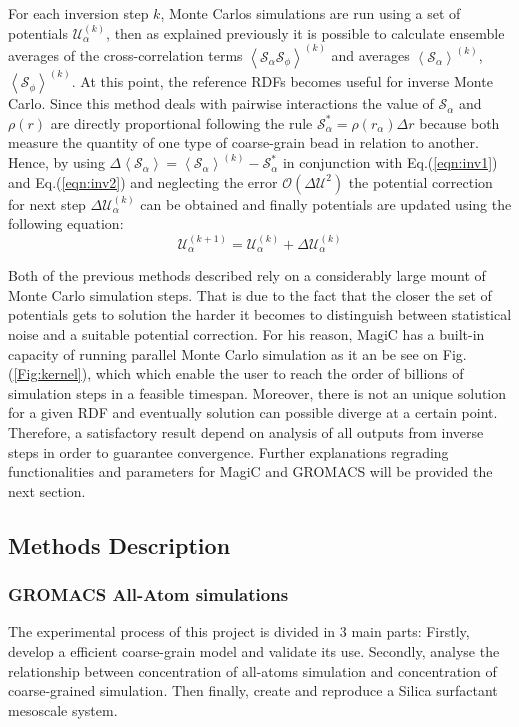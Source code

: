 \documentclass[10pt,a4paper,twoside]{article}
\begin{document}
For each inversion step $k$, Monte Carlos simulations are run using a set of potentials $\mathcal{U}_{\alpha}^{(k)}$, then as explained previously it is possible to calculate ensemble averages of the cross-correlation terms ${\left\langle\mathcal{S}_\alpha\mathcal{S}_\phi\right\rangle}^{(k)}$ and averages $\left\langle\mathcal{S}_\alpha\right\rangle^{(k)}$, $\left\langle\mathcal{S}_\phi\right\rangle^{(k)}$. At this point, the reference RDFs becomes useful for inverse Monte Carlo. Since this method deals with pairwise interactions the value of $\mathcal{S}_\alpha$ and $\rho(r)$ are directly proportional following the rule $\mathcal{S}_\alpha^{*}= \rho(r_\alpha)\Delta r $ \cite{magic} because both measure the quantity of one type of coarse-grain bead in relation to another. Hence, by using $\Delta\left\langle\mathcal{S}_\alpha\right\rangle = \left\langle\mathcal{S}_\alpha\right\rangle^{(k)} - \mathcal{S}_\alpha^{*}$  in conjunction with Eq.(\ref{eqn:inv1}) and Eq.(\ref{eqn:inv2}) and neglecting the error $\mathcal{O}({\Delta\mathcal{U}}^2)$ the potential correction for next step $\Delta\mathcal{U}_\alpha^{(k)}$ can be obtained and finally potentials are updated using the following  equation:
 \begin{equation}
\mathcal{U}_\alpha^{(k+1)}= \mathcal{U}_\alpha^{(k)}+\Delta\mathcal{U}_\alpha^{(k)}
\label{eqn:inv2}
\end{equation} 

Both of the previous methods described rely on a considerably large mount of Monte Carlo simulation steps. That is due to the fact that the closer the set of potentials gets to solution the harder it becomes to distinguish between statistical noise and a suitable potential correction. For his reason, MagiC has a built-in capacity of running parallel Monte Carlo simulation as it an be see on Fig.(\ref{Fig:kernel}), which which enable the user to reach the order of billions of simulation steps in a feasible timespan. Moreover, there is not an unique solution for a given RDF \cite{ibi} and eventually solution can possible diverge at a certain point. Therefore, a satisfactory result depend on analysis of all outputs from inverse steps in order to guarantee convergence. Further explanations regrading functionalities and parameters for MagiC and GROMACS will be provided the next section.   
 
\subsection{Methods Description} 
\subsubsection*{GROMACS All-Atom simulations}
The experimental process of this project is divided in 3 main parts: Firstly, develop a efficient coarse-grain model and validate its use. Secondly, analyse the relationship between concentration  of all-atoms simulation and concentration of coarse-grained simulation. Then finally, create and reproduce a Silica surfactant mesoscale system. 
\end{document}
